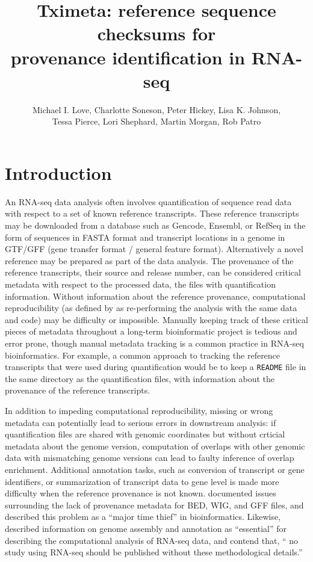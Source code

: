 \documentclass[12pt]{article}
\title{Tximeta: reference sequence checksums for \\ provenance identification in RNA-seq}
\author{Michael I. Love, Charlotte Soneson, Peter Hickey, Lisa K. Johnson, \\
Tessa Pierce, Lori Shephard, Martin Morgan, Rob Patro}
\begin{document}
\maketitle

\section*{Introduction}

An RNA-seq data analysis often involves quantification of sequence read data with respect to a set of known reference transcripts. These reference transcripts may be downloaded from a database such as Gencode, Ensembl, or RefSeq \citep{gencode,ensembl,refseq} in the form of sequences in FASTA format and transcript locations in a genome in GTF/GFF (gene transfer format / general feature format). Alternatively a novel reference may be prepared as part of the data analysis. The provenance of the reference transcripts, their source and release number, can be considered critical metadata with respect to the processed data, the files with quantification information. Without information about the reference provenance, computational reproducibility (as defined by \citet{Patil2016} as re-performing the analysis with the same data and code) may be difficulty or impossible. Manually keeping track of these critical pieces of metadata throughout a long-term bioinformatic project is tedious and error prone, though manual metadata tracking is a common practice in RNA-seq bioinformatics. For example, a common approach to tracking the reference transcripts that were used during quantification would be to keep a \texttt{README} file in the same directory as the quantification files, with information about the provenance of the reference transcripts. 

In addition to impeding computational reproducibility, missing or wrong metadata can potentially lead to serious errors in downstream analysis: if quantification files are shared with genomic coordinates but without crticial metadata about the genome version, computation of overlaps with other genomic data with mismatching genome versions can lead to faulty inference of overlap enrichment. Additional annotation tasks, such as conversion of transcript or gene identifiers, or summarization of transcript data to gene level is made more difficulty when the reference provenance is not known. \citet{Kanduri2017} documented issues surrounding the lack of provenance metadata for BED, WIG, and GFF files, and described this problem as a ``major time thief'' in bioinformatics. Likewise, \citet{Simoneau2019} described information on genome assembly and annotation as ``essential'' for describing the computational analysis of RNA-seq data, and contend that, `` no study using RNA-seq should be published without these methodological details.''
\end{document}
